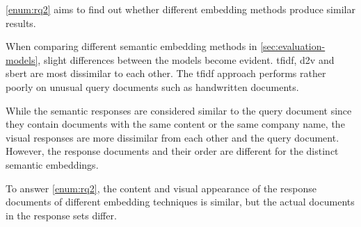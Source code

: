 \ref{enum:rq2} aims to find out whether different embedding methods produce similar results.

When comparing different semantic embedding methods in \autoref{sec:evaluation-models}, 
slight differences between the models become evident.
\ac{tfidf}, \ac{d2v} and \ac{sbert} are most dissimilar to each other.
The \ac{tfidf} approach performs rather poorly on unusual query documents such as handwritten documents.

While the semantic responses are considered similar to the query document since
they contain documents with the same content 
or the same company name,
the visual responses are more dissimilar from each other and the query document.
However, the response documents and their order are different for the distinct semantic embeddings.


To answer \ref{enum:rq2}, the content and visual appearance of the response documents 
of different embedding techniques is similar,
but the actual documents in the response sets differ.
